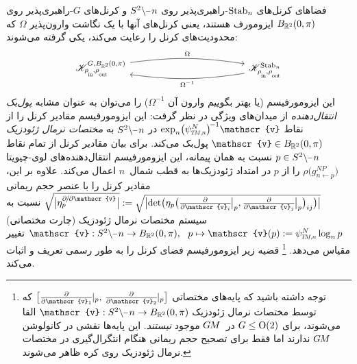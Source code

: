 فضاهای کرنل‌های $\operatorname{Stab}_{n}$-راهبری‌پذیر روی $S^2\backslash \mkern-1mu\minus\mkern1mu n$ و کرنل‌های $G$-راهبری‌پذیر روی $B_{\mathbb{R}^2}(0,\pi)$ ایزومورف هستند، یعنی کرنل‌های آنها با یک نگاشت وارون‌پذیر $\Omega$ که محدودیت‌های کرنل را رعایت می‌کند، یکی گرفته می‌شوند:
\begin{equation}
	\begin{tikzcd}[row sep=3.5em, column sep=12.em]
		\mathscr{K}^{G,B_{\R^2}\mkern-1mu(0,\pi)}_{\rhoin\mkern-1mu,\rhoout}
		\arrow[r, bend left=8, shift left=2pt, "\Omega"]
		&
		\mathscr{K}^{\Stab{n}}_{\rhoin\mkern-1mu,\rhoout}
		\arrow[l, bend left=8, shift left=2pt, "\Omega^{-1}"]
	\end{tikzcd}
\end{equation}
این ایزومورفیسم (یا بهتر بگوییم وارون آن $\Omega^{-1}$) را می‌توان به عنوان مشابه \emph{پول‌بک انتقال‌دهنده} از میدان‌های ویژگی در نظر گرفت:
این ایزومورفیسم مقادیر کرنل را از نقاط $\exp_n\! \big(\psiTMn^N\big)^{\!-1} \mathscr{v}$ در $S^2\backslash \mkern-1mu\minus\mkern1mu n$ به \emph{مختصات نرمال ژئودزیک} $\mathscr{v}\in B_{\R^2}(0,\pi)$ پول‌بک می‌کند.
برای بیان مقادیر کرنل از تمام نقاط $p\in S^2\backslash \mkern-1mu\minus\mkern1mu n$ نسبت به همان پیمانه، این ایزومورفیسم انتقال‌دهنده‌های لوی-چیویتا $\rho\big( g_{n\leftarrow p}^{NP} \big)$ را از $p$ در امتداد ژئودزیک‌ها به قطب شمال~$n$ اعمال می‌کند.
علاوه بر این، مقادیر کرنل را با عنصر حجم ریمانی
$\sqrt{\big|\eta_p^{\partial\mkern-2mu/\mkern-2mu\partial\mathscr{v}}\big|}
:= {\sqrt{\big| \!\det\!\big( \eta_p\big( \frac{\partial}{\partial \mathscr{v}_i} \mkern-2mu\big|_p, \frac{\partial}{\partial \mathscr{v}_j} \mkern-2mu\big|_p \big)_{ij} \big)\big|} }$
نسبت به سیستم مختصات نرمال ژئودزیک (چارت مختصاتی)
$\mathscr{v}: S^2\backslash \mkern-1mu\minus\mkern1mu n \to B_{\R^2}(0,\pi),\ \ p \mapsto \mathscr{v}(p) := \psiTMn^N \log_n p$ تغییر مقیاس می‌دهد.%
\footnote{
	توجه داشته باشید که پایه‌های مختصاتی
	$\big[ \frac{\partial}{\partial\mathscr{v}_1} \mkern-2mu|_p,\, \frac{\partial}{\partial\mathscr{v}_2} \mkern-2mu|_p \big]$
	که توسط مختصات نرمال ژئودزیک
	$\mathscr{v}: S^2\backslash \mkern-1mu\minus\mkern1mu n \to B_{\R^2}(0,\pi)$
	القا می‌شوند، برای $G\leq\operatorname{O}(2)$ در~$G\mkern-1.4muM$ موجود \emph{نیستند}.
	این پایه‌ها نقشی در کانولوشن $G\mkern-1.4muM$ ندارند اما فقط برای تصحیح حجم ریمانی هنگام انتگرال‌گیری در مختصات نرمال ژئودزیک روی کره ظاهر می‌شوند.
}
قضیه زیر ایزومورفیسم فضای کرنل را به طور رسمی تعریف و اثبات می‌کند.
